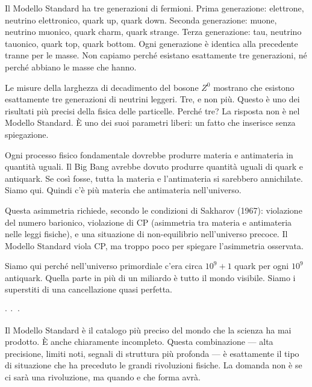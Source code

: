 \documentclass[12pt,a4paper,openany]{book}
\newcommand{\sezione}[1]{\vspace{1.2em}{\large\bfseries #1}\vspace{0.5em}\par}
\newcommand{\puntini}{\begin{center}$\cdot\ \cdot\ \cdot$\end{center}\vspace{0.3em}}
\begin{document}
\sezione{Il problema della generazione: perché tre?}

Il Modello Standard ha tre generazioni di fermioni. Prima generazione: elettrone, neutrino elettronico, quark up, quark down. Seconda generazione: muone, neutrino muonico, quark charm, quark strange. Terza generazione: tau, neutrino tauonico, quark top, quark bottom. Ogni generazione è identica alla precedente tranne per le masse. Non capiamo perché esistano esattamente tre generazioni, né perché abbiano le masse che hanno.

Le misure della larghezza di decadimento del bosone $Z^0$ mostrano che esistono esattamente tre generazioni di neutrini leggeri. Tre, e non più. Questo è uno dei risultati più precisi della fisica delle particelle. Perché tre? La risposta non è nel Modello Standard. È uno dei suoi parametri liberi: un fatto che inserisce senza spiegazione.

\sezione{Il problema della materia: perché più materia che antimateria?}

Ogni processo fisico fondamentale dovrebbe produrre materia e antimateria in quantità uguali. Il Big Bang avrebbe dovuto produrre quantità uguali di quark e antiquark. Se così fosse, tutta la materia e l'antimateria si sarebbero annichilate. Siamo qui. Quindi c'è più materia che antimateria nell'universo.

Questa asimmetria richiede, secondo le condizioni di Sakharov (1967): violazione del numero barionico, violazione di CP (asimmetria tra materia e antimateria nelle leggi fisiche), e una situazione di non-equilibrio nell'universo precoce. Il Modello Standard viola CP, ma troppo poco per spiegare l'asimmetria osservata.

Siamo qui perché nell'universo primordiale c'era circa $10^9 + 1$ quark per ogni $10^9$ antiquark. Quella parte in più di un miliardo è tutto il mondo visibile. Siamo i superstiti di una cancellazione quasi perfetta.

\puntini

Il Modello Standard è il catalogo più preciso del mondo che la scienza ha mai prodotto. È anche chiaramente incompleto. Questa combinazione --- alta precisione, limiti noti, segnali di struttura più profonda --- è esattamente il tipo di situazione che ha preceduto le grandi rivoluzioni fisiche. La domanda non è se ci sarà una rivoluzione, ma quando e che forma avrà.

\end{document}

